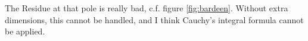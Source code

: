 \documentclass[10pt,a4paper, fleqn]{article}
\begin{document}
The Residue at that pole is really bad, c.f. figure \ref{fig:bardeen}.   Without extra dimensions, this cannot be handled, and I think Cauchy's integral formula cannot be applied.

\begin{figure}
\center
{}
\end{figure}
\end{document}
